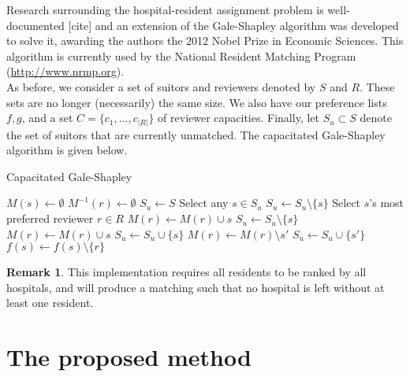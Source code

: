 \documentclass{article}
\theoremstyle{definition}
\newtheorem*{remark}{Remark}
\begin{document}
Research surrounding the hospital-resident assignment problem is well-documented 
[cite] and an extension of the Gale-Shapley algorithm was developed to solve it,
awarding the authors the 2012 Nobel Prize in Economic Sciences. This algorithm
is currently used by the National Resident Matching Program 
(\url{http://www.nrmp.org}). \\

As before, we consider a set of suitors and reviewers denoted by $S$ and $R$. 
These sets are no longer (necessarily) the same size. We also have our 
preference lists $f, g$, and a set $C = \{ c_1, \ldots, c_{|R|} \}$ of reviewer
capacities. Finally, let $S_u \subset S$ denote the set of suitors that are 
currently unmatched. The capacitated Gale-Shapley algorithm is given below.

\begin{algorithm}[H]
\caption{Capacitated Gale-Shapley}\label{alg:cap-galeshapley}
    \begin{algorithmic}[0]
	    \State $M(s) \gets \emptyset$
	\EndFor
	    \State $M^{-1}(r) \gets \emptyset$
	\EndFor
	    \State $S_u \gets S$
	        \State Select any $s \in S_u$
		    \State $S_u \gets S_u \setminus \{s\}$
		\Else
		    \State Select $s$'s most preferred reviewer $r \in R$
			\State $M(r) \gets M(r) \cup s$
			\State $S_u \gets S_u \setminus \{s\}$
		    \Else
				    \State $M(r) \gets M(r) \cup s$
				    \State $S_u \gets S_u \cup \{s\}$
				    \State $M(r) \gets M(r) \setminus s'$
				    \State $S_u \gets S_u \cup \{s'\}$
				\Else
				    \State $f(s) \gets f(s) \setminus \{r\}$
				\EndIf
			    \EndIf
			\EndFor
		    \EndIf
		\EndIf
	    \EndWhile
	\end{algorithmic}
\end{algorithm}

\begin{remark}
	This implementation requires all residents to be ranked by all 
	hospitals, and will produce a matching such that no hospital is left 
	without at least one resident.
\end{remark}



\section{The proposed method}\label{section:new-method}
\end{document}
